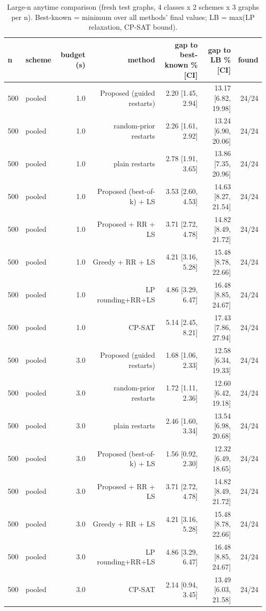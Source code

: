 \begin{table}[t]
\centering
\caption{Large-n anytime comparison (fresh test graphs, 4 classes x 2 schemes x 3 graphs per n). Best-known = minimum over all methods' final values; LB = max(LP relaxation, CP-SAT bound).}
\label{tab:rev2_step2_gaps}
\scriptsize
\begin{tabular}{llrrrrr}
\toprule
n & scheme & budget (s) & method & gap to best-known \% [CI] & gap to LB \% [CI] & found \\
\midrule
500 & pooled & 1.0 & Proposed (guided restarts) & 2.20 [1.45, 2.94] & 13.17 [6.82, 19.98] & 24/24 \\
500 & pooled & 1.0 & random-prior restarts & 2.26 [1.61, 2.92] & 13.24 [6.90, 20.06] & 24/24 \\
500 & pooled & 1.0 & plain restarts & 2.78 [1.91, 3.65] & 13.86 [7.35, 20.96] & 24/24 \\
500 & pooled & 1.0 & Proposed (best-of-k) + LS & 3.53 [2.60, 4.53] & 14.63 [8.27, 21.54] & 24/24 \\
500 & pooled & 1.0 & Proposed + RR + LS & 3.71 [2.72, 4.78] & 14.82 [8.49, 21.72] & 24/24 \\
500 & pooled & 1.0 & Greedy + RR + LS & 4.21 [3.16, 5.28] & 15.48 [8.78, 22.66] & 24/24 \\
500 & pooled & 1.0 & LP rounding+RR+LS & 4.86 [3.29, 6.47] & 16.48 [8.85, 24.67] & 24/24 \\
500 & pooled & 1.0 & CP-SAT & 5.14 [2.45, 8.21] & 17.43 [7.86, 27.94] & 24/24 \\
500 & pooled & 3.0 & Proposed (guided restarts) & 1.68 [1.06, 2.33] & 12.58 [6.34, 19.33] & 24/24 \\
500 & pooled & 3.0 & random-prior restarts & 1.72 [1.11, 2.36] & 12.60 [6.42, 19.18] & 24/24 \\
500 & pooled & 3.0 & plain restarts & 2.46 [1.60, 3.34] & 13.54 [6.98, 20.68] & 24/24 \\
500 & pooled & 3.0 & Proposed (best-of-k) + LS & 1.56 [0.92, 2.30] & 12.32 [6.49, 18.65] & 24/24 \\
500 & pooled & 3.0 & Proposed + RR + LS & 3.71 [2.72, 4.78] & 14.82 [8.49, 21.72] & 24/24 \\
500 & pooled & 3.0 & Greedy + RR + LS & 4.21 [3.16, 5.28] & 15.48 [8.78, 22.66] & 24/24 \\
500 & pooled & 3.0 & LP rounding+RR+LS & 4.86 [3.29, 6.47] & 16.48 [8.85, 24.67] & 24/24 \\
500 & pooled & 3.0 & CP-SAT & 2.14 [0.94, 3.45] & 13.49 [6.03, 21.58] & 24/24 \\

\end{tabular}
\end{table}
